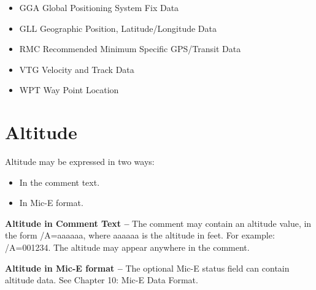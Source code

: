 \begin{itemize}

\item GGA Global Positioning System Fix Data
\item GLL Geographic Position, Latitude/Longitude Data
\item RMC Recommended Minimum Specific GPS/Transit Data
\item VTG Velocity and Track Data
\item WPT Way Point Location


\end{itemize}



\section{Altitude}

Altitude may be expressed in two ways:

\begin{itemize}
\item In the comment text.
\item In Mic-E format.
\end{itemize}

\textbf{Altitude in Comment Text --} The comment may contain an altitude value,
in the form /A=aaaaaa, where aaaaaa is the altitude in feet. For example:
/A=001234. The altitude may appear anywhere in the comment.

\textbf{Altitude in Mic-E format --} The optional Mic-E status field can contain
altitude data. See Chapter 10: Mic-E Data Format.

